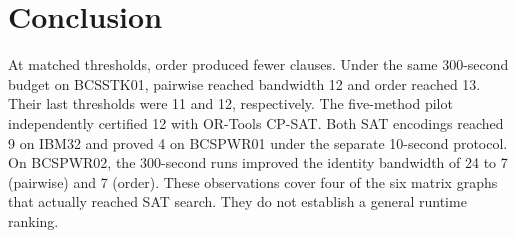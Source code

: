 \section{Conclusion}
At matched thresholds, order produced fewer clauses. Under the same
300-second budget on BCSSTK01, pairwise reached bandwidth 12 and order
reached 13. Their last thresholds were 11 and 12, respectively.
The five-method pilot independently certified 12 with OR-Tools CP-SAT.
Both SAT encodings reached 9 on IBM32 and proved 4 on BCSPWR01 under the
separate 10-second protocol. On BCSPWR02, the 300-second runs improved the identity bandwidth of 24 to 7 (pairwise) and 7 (order). These observations cover four of the six matrix graphs
that actually reached SAT search. They do not establish a general runtime
ranking.

